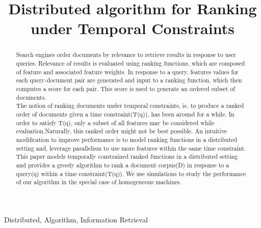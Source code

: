\documentclass[10pt, conference, compsocconf]{IEEEtran}
\begin{document}
\title{Distributed algorithm for Ranking under Temporal Constraints}


\author{
}


\maketitle


\begin{abstract}
Search engines order documents by relevance to retrieve results in response to user queries. Relevance of results is evaluated using ranking functions, which are composed of feature and associated feature weights. In response to a query, features values for each query-document pair are generated and input to a ranking function, which then computes a score for each pair. This score is used to generate an ordered subset of documents.\\
The notion of ranking documents under temporal constraints, ie. to produce a ranked order of documents given a time constraint(T(q)), has been around for a while. In order to satisfy T(q), only a subset of all features may be considered while evaluation.Naturally, this ranked order might not be best possible. An intuitive modification to improve performance is to model ranking functions in a distributed setting and, leverage parallelism to use more features within the same time constraint.\\
This paper models temporally constrained ranked functions in a distributed setting and provides a greedy algorithm to rank a document corpus(D) in response to a query(q) within a time constraint(T(q)). We use simulations to study the performance of our algorithm in the special case of homogeneous machines.\end{abstract}

\begin{IEEEkeywords}
Distributed, Algorithm, Information Retrieval
\end{IEEEkeywords}
\end{document}
